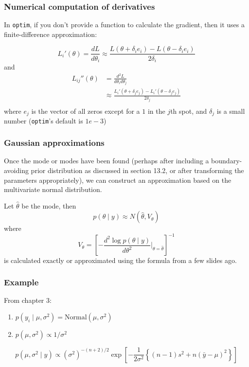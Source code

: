 \documentclass{beamer}
\begin{document}
\begin{frame}[fragile]
\frametitle{Numerical computation of derivatives}

In \verb|optim|, if you don't provide a function to calculate the gradient, then it uses a finite-difference approximation:

$$
L_i'(\theta) = \frac{dL}{d\theta_i } \approx \frac{L(\theta + \delta_i e_i ) - L(\theta - \delta_i e_i )}{2 \delta_i }
$$
and
\begin{align*}
L_{ij}''(\theta) &= \frac{d^2L}{d\theta_i d\theta_j } \\
&\approx \frac{ L_i'(\theta + \delta_j e_j ) - L_i'(\theta - \delta_j e_j )}{2 \delta_j } \\
\end{align*}
where $e_j$ is the vector of all zeros except for a $1$ in the $j$th spot, and $\delta_j$ is a small number (\verb|optim|'s default is $1e-3$)
\end{frame}

\begin{frame}[fragile]
\frametitle{Gaussian approximations}

Once the mode or modes have been found (perhaps after including a boundary-avoiding prior distribution as discussed in section 13.2, or after transforming the parameters appropriately), we can construct an approximation based on the multivariate normal distribution. 
\newline

Let $\hat{\theta}$ be the mode, then 
$$
p(\theta \mid y) \approx N(\hat{\theta}, V_{\theta})
$$
where 
$$
V_{\theta} = \left[- \frac{d^2 \log p(\theta \mid y) }{d\theta^2}\bigg\rvert_{\theta = \hat{\theta}} \right]^{-1}
$$
is calculated exactly or approximated using the formula from a few slides ago.

\end{frame}


\begin{frame}[fragile]
\frametitle{Example}

From chapter 3:
\begin{enumerate}
\item $p(y_i \mid \mu, \sigma^2) = \text{Normal}(\mu, \sigma^2)$
\item $p(\mu, \sigma^2) \propto 1/\sigma^2$
\end{enumerate}
\[
p(\mu, \sigma^2 \mid y) \propto (\sigma^2)^{-(n+2)/2}\exp\left[ - \frac{1}{2\sigma^2}\left\{(n-1)  s^2 + n(\bar{y} - \mu)^2 \right\} \right]
\]



\end{frame}
\end{document}
